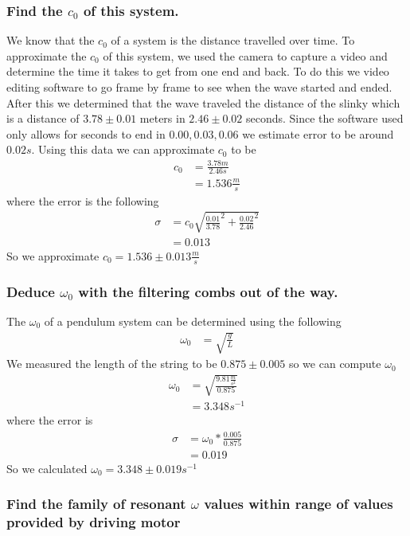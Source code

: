 \documentclass{article}
\begin{document}
\subsubsection*{Find the $c_0$ of this system.}
We know that the $c_0$ of a system is the distance travelled over time. To
approximate the $c_0$ of this system, we used the camera to capture a video
and determine the time it takes to get from one end and back. To do this we
video editing software to go frame by frame to see when the wave started and
ended. After this we determined that the wave traveled the distance of the
slinky which is a distance of $3.78 \pm 0.01$ meters in $2.46 \pm 0.02$ seconds.
Since the software used only allows for seconds to end in $0.00,0.03, 0.06$ we
estimate error to be around $0.02s$. Using this data we can approximate $c_0$
to be
\begin{align*}
    c_0 &= \frac{3.78m}{2.46s}\\
    &= 1.536 \frac{m}{s}
\end{align*}
where the error is the following
\begin{align*}
    \sigma &= c_0 \sqrt{\frac{0.01}{3.78}^2 + \frac{0.02}{2.46}^2}\\
    &= 0.013
\end{align*}
So we approximate $c_0 = 1.536 \pm 0.013 \frac{m}{s}$
\subsubsection*{Deduce $\omega_0$ with the filtering combs out of the way.}
The $\omega_0$ of a pendulum system can be determined using the following
\begin{align*}
    \omega_0 &= \sqrt{\frac{g}{L}}
\end{align*}
We measured the length of the string to be $0.875 \pm 0.005$ so we can compute
$\omega_0$
\begin{align*}
    \omega_0 &= \sqrt{\frac{9.81\frac{m}{s^2}}{0.875}}\\
    &= 3.348 s^{-1}
\end{align*}
where the error is 
\begin{align*}
    \sigma &= \omega_0 * \frac{0.005}{0.875}\\
    &= 0.019
\end{align*}
So we calculated $\omega_0 = 3.348 \pm 0.019 s^{-1}$ 


\newpage
\subsubsection*{Find the family of resonant $\omega$ values within range of
values provided by driving motor}
\end{document}
